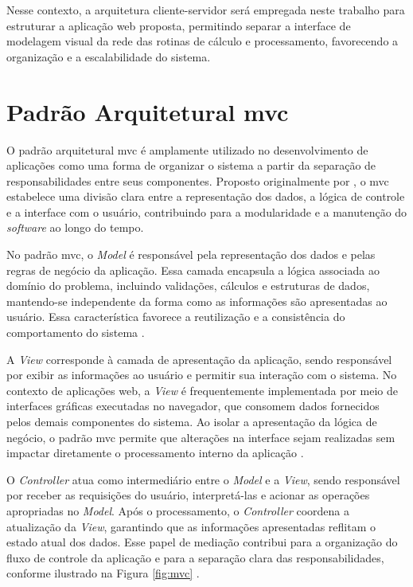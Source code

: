 Nesse contexto, a arquitetura cliente-servidor será empregada neste trabalho para estruturar a aplicação web proposta, permitindo separar a interface de modelagem visual da rede das rotinas de cálculo e processamento, favorecendo a organização e a escalabilidade do sistema.

\section{Padrão Arquitetural \gls{mvc}}

O padrão arquitetural \gls{mvc} é amplamente utilizado no desenvolvimento de aplicações como uma forma de organizar o sistema a partir da separação de responsabilidades entre seus componentes. Proposto originalmente por , o \gls{mvc} estabelece uma divisão clara entre a representação dos dados, a lógica de controle e a interface com o usuário, contribuindo para a modularidade e a manutenção do \textit{software} ao longo do tempo.

No padrão \gls{mvc}, o \textit{Model} é responsável pela representação dos dados e pelas regras de negócio da aplicação. Essa camada encapsula a lógica associada ao domínio do problema, incluindo validações, cálculos e estruturas de dados, mantendo-se independente da forma como as informações são apresentadas ao usuário. Essa característica favorece a reutilização e a consistência do comportamento do sistema \cite{pressman2014software}.

A \textit{View} corresponde à camada de apresentação da aplicação, sendo responsável por exibir as informações ao usuário e permitir sua interação com o sistema. No contexto de aplicações web, a \textit{View} é frequentemente implementada por meio de interfaces gráficas executadas no navegador, que consomem dados fornecidos pelos demais componentes do sistema. Ao isolar a apresentação da lógica de negócio, o padrão \gls{mvc} permite que alterações na interface sejam realizadas sem impactar diretamente o processamento interno da aplicação \cite{sommerville2016software}.

O \textit{Controller} atua como intermediário entre o \textit{Model} e a \textit{View}, sendo responsável por receber as requisições do usuário, interpretá-las e acionar as operações apropriadas no \textit{Model}. Após o processamento, o \textit{Controller} coordena a atualização da \textit{View}, garantindo que as informações apresentadas reflitam o estado atual dos dados. Esse papel de mediação contribui para a organização do fluxo de controle da aplicação e para a separação clara das responsabilidades, conforme ilustrado na Figura \ref{fig:mvc} \cite{pressman2014software}.


